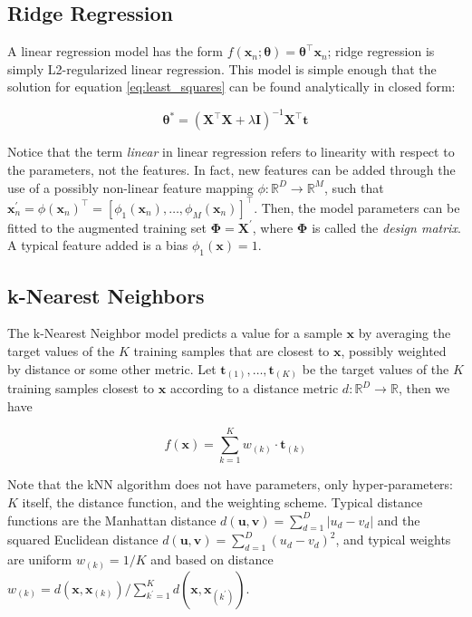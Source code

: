 \documentclass[a4paper,11pt]{kth-mag}
\begin{document}
\subsection{Ridge Regression}
\label{sec:ridge}
A linear regression model has the form $f(\bm x_n;\bm\theta)=\bm\theta^\intercal\bm x_n$; ridge regression is simply L2-regularized linear regression. This model is simple enough that the solution for equation \ref{eq:least_squares} can be found analytically in closed form:

\begin{equation}
\label{eq:ridge_solution}
\bm\theta^*=(\bm X^\intercal\bm X+\lambda\bm I)^{-1}\bm X^\intercal\bm t
\end{equation}

Notice that the term \emph{linear} in linear regression refers to linearity with respect to the parameters, not the features. In fact, new features can be added through the use of a possibly non-linear feature mapping $\phi:\mathbb{R}^D\rightarrow\mathbb{R}^M$, such that $\bm x^\prime_n=\phi(\bm x_n)^\intercal=\left[\phi_1(\bm x_n),\ldots,\phi_M(\bm x_n)\right]^\intercal$. Then, the model parameters can be fitted to the augmented training set $\bm\Phi=\bm X^\prime$, where $\bm\Phi$ is called the \emph{design matrix}. A typical feature added is a bias $\phi_1(\bm x)=1$.

\subsection{k-Nearest Neighbors}
\label{sec:knn}
The k-Nearest Neighbor model \citep{knn} predicts a value for a sample $\bm x$ by averaging the target values of the $K$ training samples that are closest to $\bm x$, possibly weighted by distance or some other metric. Let $\bm t_{(1)},\ldots,\bm t_{(K)}$ be the target values of the $K$ training samples closest to $\bm x$ according to a distance metric $d:\mathbb{R}^D\rightarrow\mathbb{R}$, then we have

\begin{equation}
f(\bm x)=\sum_{k=1}^K w_{(k)}\cdot\bm t_{(k)}
\end{equation}


Note that the kNN algorithm does not have parameters, only hyper-parameters: $K$ itself, the distance function, and the weighting scheme. Typical distance functions are the Manhattan distance $d(\bm u,\bm v)=\sum_{d=1}^D\vert u_d-v_d\vert$ and the squared Euclidean distance $d(\bm u,\bm v)=\sum_{d=1}^D(u_d-v_d)^2$, and typical weights are uniform $w_{(k)}=1/K$ and based on distance $w_{(k)}=d(\bm x,\bm x_{(k)})/\sum_{k^\prime=1}^K d(\bm x,\bm x_{(k^\prime)})$.
\end{document}
